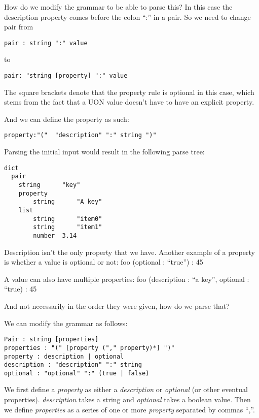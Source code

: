 \documentclass[12pt]{article}
\begin{document}
How do we modify the grammar to be able to parse this? In this case the description property comes before the colon “:” in a pair. So we need to change pair from 

\begin{lstlisting}
pair : string ":" value
\end{lstlisting}

to

\begin{lstlisting}
pair: "string [property] ":" value
\end{lstlisting}
The square brackets denote that the property rule is optional in this case, which stems from the fact that a UON value doesn’t have to have an explicit property.

And we can define the property as such:

\begin{lstlisting}
property:"("  "description" ":" string ")"
\end{lstlisting}

Parsing the initial input would result in the following parse tree:

\begin{lstlisting}
dict
  pair
    string      "key"
    property
        string      "A key"
    list
        string      "item0"
        string      "item1"
        number  3.14
\end{lstlisting}

Description isn’t the only property that we have. Another example of a property is whether a value is optional or not:
foo (optional : “true”) : 45

A value can also have multiple properties:
foo (description : “a key”, optional : “true) : 45

And not necessarily in the order they were given, how do we parse that?

We can modify the grammar as follows: 

\begin{lstlisting}
Pair : string [properties]
properties : "(" [property ("," property)*] ")"
property : description | optional
description : "description" ":" string
optional : "optional" ":" (true | false)
\end{lstlisting}

We first define a \emph{property} as either a \emph{description} or \emph{optional} (or other eventual properties). \emph{description} takes a string and \emph{optional} takes a boolean value. Then we define \emph{properties} as a series of one or more \emph{property} separated by commas “,”. 
\end{document}
